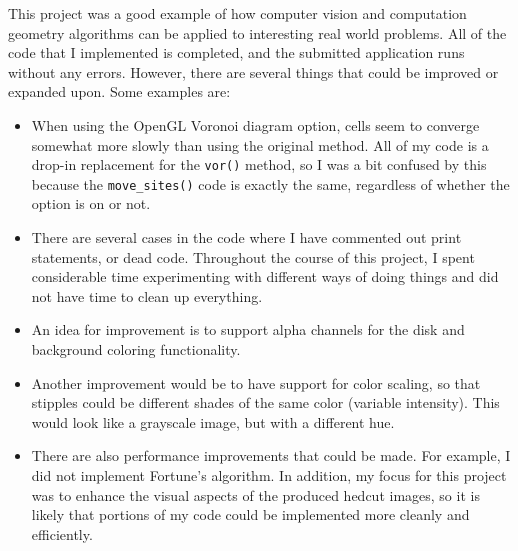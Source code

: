 \documentclass[11pt]{article}
\begin{document}
This project was a good example of how computer vision and computation geometry algorithms can be applied to interesting real world problems. All of the code that I implemented is completed, and the submitted application runs without any errors. However, there are several things that could be improved or expanded upon. Some examples are:

\begin{itemize}
	\item When using the OpenGL Voronoi diagram option, cells seem to converge somewhat more slowly than using the original method. All of my code is a drop-in replacement for the \verb|vor()| method, so I was a bit confused by this because the \verb|move_sites()| code is exactly the same, regardless of whether the option is on or not.
	\item There are several cases in the code where I have commented out print statements, or dead code. Throughout the course of this project, I spent considerable time experimenting with different ways of doing things and did not have time to clean up everything.
	\item An idea for improvement is to support alpha channels for the disk and background coloring functionality.
	\item Another improvement would be to have support for color scaling, so that stipples could be different shades of the same color (variable intensity). This would look like a grayscale image, but with a different hue.
	\item There are also performance improvements that could be made. For example, I did not implement Fortune's algorithm. In addition, my focus for this project was to enhance the visual aspects of the produced hedcut images, so it is likely that portions of my code could be implemented more cleanly and efficiently.
\end{itemize}



\end{document}
